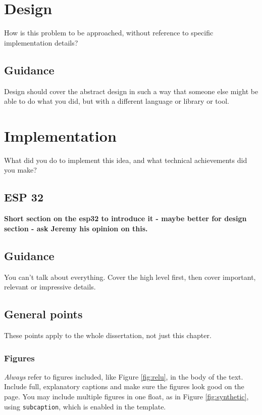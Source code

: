 \documentclass{l4proj}
\begin{document}
\chapter{Design}
How is this problem to be approached, without reference to specific implementation details?
\section{Guidance}
Design should cover the abstract design in such a way that someone else might be able to do what you did, but with a different language or library or tool.

\chapter{Implementation}
What did you do to implement this idea, and what technical achievements did you make?

\section{ESP 32}

\textbf{Short section on the esp32 to introduce it - maybe better for design section - ask Jeremy his opinion on this. }\\

\section{Guidance}
You can't talk about everything. Cover the high level first, then cover important, relevant or impressive details.



\section{General points}

These points apply to the whole dissertation, not just this chapter.



\subsection{Figures}
\emph{Always} refer to figures included, like Figure \ref{fig:relu}, in the body of the text. Include full, explanatory captions and make sure the figures look good on the page.
You may include multiple figures in one float, as in Figure \ref{fig:synthetic}, using \texttt{subcaption}, which is enabled in the template.
\end{document}
